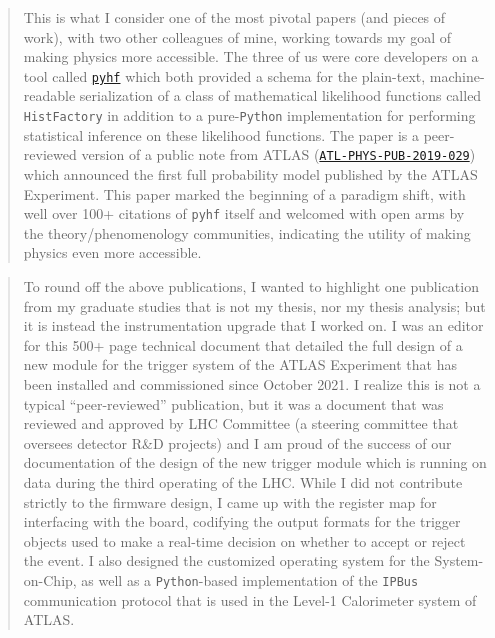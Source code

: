 \begin{quotation}
	This is what I consider one of the most pivotal papers (and pieces of work), with two other colleagues of mine, working towards my goal of making physics more accessible.
	The three of us were core developers on a tool called \href{https://scikit-hep.org/pyhf/}{\texttt{pyhf}} which both provided a schema for the plain-text, machine-readable serialization of a class of mathematical likelihood functions called \texttt{HistFactory} in addition to a pure-\texttt{Python} implementation for performing statistical inference on these likelihood functions.
	The paper is a peer-reviewed version of a public note from ATLAS (\href{https://atlas.web.cern.ch/Atlas/GROUPS/PHYSICS/PUBNOTES/ATL-PHYS-PUB-2019-029}{\texttt{ATL-PHYS-PUB-2019-029}}) which announced the first full probability model published by the ATLAS Experiment.
	This paper marked the beginning of a paradigm shift, with well over 100+ citations of \texttt{pyhf} itself and welcomed with open arms by the theory/phenomenology communities, indicating the utility of making physics even more accessible.
\end{quotation}

\begin{quotation}
	To round off the above publications, I wanted to highlight one publication from my graduate studies that is not my thesis, nor my thesis analysis; but it is instead the instrumentation upgrade that I worked on.
	I was an editor for this 500+ page technical document that detailed the full design of a new module for the trigger system of the ATLAS Experiment that has been installed and commissioned since October 2021.
	I realize this is not a typical \enquote{peer-reviewed} publication, but it was a document that was reviewed and approved by LHC Committee (a steering committee that oversees detector R\&D projects) and I am proud of the success of our documentation of the design of the new trigger module which is running on data during the third operating of the LHC.
	While I did not contribute strictly to the firmware design, I came up with the register map for interfacing with the board, codifying the output formats for the trigger objects used to make a real-time decision on whether to accept or reject the event.
	I also designed the customized operating system for the System-on-Chip, as well as a \texttt{Python}-based implementation of the \texttt{IPBus} communication protocol that is used in the Level-1 Calorimeter system of ATLAS.
\end{quotation}
